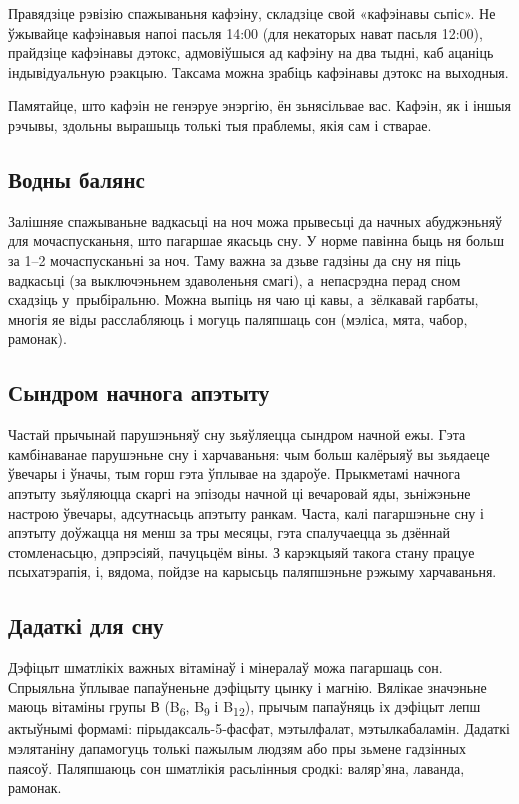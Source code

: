Правядзіце рэвізію спажываньня кафэіну, складзіце свой «кафэінавы сьпіс». Не ўжывайце кафэінавыя напоі пасьля 14:00 (для некаторых нават пасьля 12:00), прайдзіце кафэінавы дэтокс, адмовіўшыся ад кафэіну на два тыдні, каб ацаніць індывідуальную рэакцыю. Таксама можна зрабіць кафэінавы дэтокс на выходныя.

Памятайце, што кафэін не генэруе энэргію, ён зьнясільвае вас. Кафэін, як і іншыя рэчывы, здольны вырашыць толькі тыя праблемы, якія сам і стварае. 


\subsection*{Водны балянс}

Залішняе спажываньне вадкасьці на ноч можа прывесьці да начных абуджэньняў для мочаспусканьня, што пагаршае якасьць сну. У норме павінна быць ня больш за 1--2 мочаспусканьні за ноч. Таму важна за дзьве гадзіны да сну ня піць вадкасьці (за выключэньнем здаволеньня смагі), а~непасрэдна перад сном схадзіць у~прыбіральню. Можна выпіць ня чаю ці кавы, а~зёлкавай гарбаты, многія яе віды расслабляюць і могуць паляпшаць сон (мэліса, мята, чабор, рамонак).

\subsection*{Сындром начнога апэтыту}

Частай прычынай парушэньняў сну зьяўляецца сындром начной ежы. Гэта камбінаванае парушэньне сну і харчаваньня: чым больш калёрыяў вы зьядаеце ўвечары і ўначы, тым горш гэта ўплывае на здароўе. Прыкметамі начнога апэтыту зьяўляюцца скаргі на эпізоды начной ці вечаровай яды, зьніжэньне настрою ўвечары, адсутнасьць апэтыту ранкам. Часта, калі пагаршэньне сну і апэтыту доўжацца ня менш за тры месяцы, гэта спалучаецца зь дзённай стомленасьцю, дэпрэсіяй, пачуцьцём віны. З карэкцыяй такога стану працуе псыхатэрапія, і, вядома, пойдзе на карысьць паляпшэньне рэжыму харчаваньня.

\subsection*{Дадаткі для сну}

Дэфіцыт шматлікіх важных вітамінаў і мінералаў можа пагаршаць сон. Спрыяльна ўплывае папаўненьне дэфіцыту цынку і магнію. Вялікае значэньне маюць вітаміны групы В (B\textsubscript{6}, B\textsubscript{9} і B\textsubscript{12}), прычым папаўняць іх дэфіцыт лепш актыўнымі формамі: пірыдаксаль-5-фасфат, мэтылфалат, мэтылкабаламін. Дадаткі мэлятаніну дапамогуць толькі пажылым людзям або пры зьмене гадзінных паясоў. Паляпшаюць сон шматлікія расьлінныя сродкі: валяр'яна, лаванда, рамонак.

